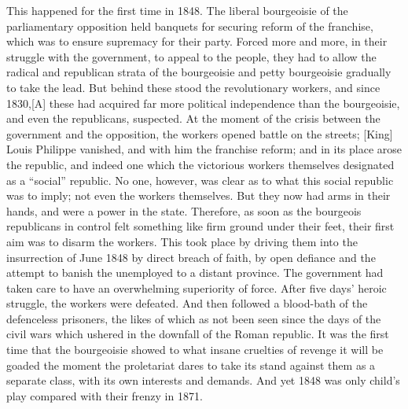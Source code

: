 \documentclass{book}
\begin{document}
This happened for the first time in 1848. The liberal bourgeoisie of the
parliamentary opposition held banquets for securing reform of the
franchise, which was to ensure supremacy for their party. Forced more and
more, in their struggle with the government, to appeal to the people, they
had to allow the radical and republican strata of the bourgeoisie and
petty bourgeoisie gradually to take the lead. But behind these stood the
revolutionary workers, and since 1830,[A] these had acquired far more
political independence than the bourgeoisie, and even the republicans,
suspected. At the moment of the crisis between the government and the
opposition, the workers opened battle on the streets; [King] Louis
Philippe vanished, and with him the franchise reform; and in its place
arose the republic, and indeed one which the victorious workers themselves
designated as a “social” republic. No one, however, was clear as to what
this social republic was to imply; not even the workers themselves. But
they now had arms in their hands, and were a power in the state.
Therefore, as soon as the bourgeois republicans in control felt something
like firm ground under their feet, their first aim was to disarm the
workers. This took place by driving them into the insurrection of June
1848 by direct breach of faith, by open defiance and the attempt to banish
the unemployed to a distant province. The government had taken care to
have an overwhelming superiority of force. After five days’ heroic
struggle, the workers were defeated. And then followed a blood-bath of the
defenceless prisoners, the likes of which as not been seen since the days
of the civil wars which ushered in the downfall of the Roman republic. It
was the first time that the bourgeoisie showed to what insane cruelties of
revenge it will be goaded the moment the proletariat dares to take its
stand against them as a separate class, with its own interests and
demands. And yet 1848 was only child’s play compared with their frenzy in
1871.
\end{document}
